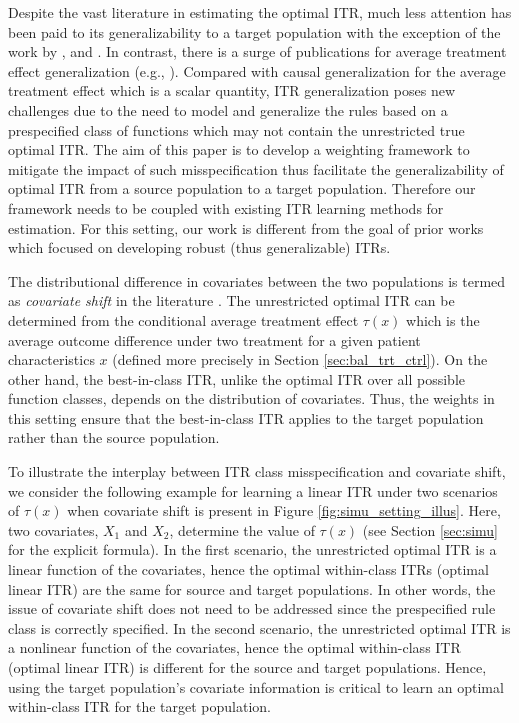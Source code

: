 \documentclass[12pt]{article}
\begin{document}
Despite the vast literature in estimating the optimal ITR, much less attention has been paid to its generalizability to a target population with the exception of the work by \citet{zhao2019robustifying}, and \citet{mo2020learning}. In contrast, there is a surge of publications for average treatment effect generalization (e.g., \cite{Cole2010,tipton2013improving, buchanan2018generalizing,dahabreh2020extending}). Compared with causal generalization for the average treatment effect which is a scalar quantity, ITR generalization poses new challenges due to the need to model and generalize the rules based on a prespecified class of functions which may not contain the unrestricted true optimal ITR. The aim of this paper is to develop a weighting framework to mitigate the impact of such misspecification thus facilitate the generalizability of optimal ITR from a source population to a target population. Therefore our framework needs to be coupled with existing ITR learning methods for estimation. For this setting, our work is different from the goal of prior works \citep{zhao2019robustifying,mo2020learning} which focused on developing robust (thus generalizable) ITRs. 

The distributional difference in covariates between the two populations is termed as \textit{covariate shift} in the literature \citep{sugiyama2007covariate}. The unrestricted optimal ITR can be determined from the conditional average treatment effect $\tau(x)$ which is the average outcome difference under two treatment for a given patient characteristics $x$ (defined more precisely in Section \ref{sec:bal_trt_ctrl}). On the other hand, the best-in-class ITR, unlike the optimal ITR over all possible function classes, depends on the distribution of covariates. Thus, the weights in this setting ensure that the best-in-class ITR applies to the target population rather than the source population.
	
	
To illustrate the interplay between ITR class misspecification and covariate shift, we consider  the following example for  learning a linear ITR under two scenarios of $\tau(x)$ when covariate shift is present in Figure \ref{fig:simu_setting_illus}. Here, two covariates, $X_1$ and $X_2$, determine the value of $\tau(x)$ (see Section \ref{sec:simu} for the explicit formula). In the first scenario, the unrestricted optimal ITR is a linear function of the covariates, hence the optimal within-class ITRs (optimal linear ITR) are the same for source and target populations. In other words, the issue of covariate shift does not need to be addressed since the prespecified rule class is correctly specified. In the second scenario, the unrestricted optimal ITR is a nonlinear function of the covariates, hence the optimal within-class ITR (optimal linear ITR) is different for the source and target populations. Hence, using the target population's covariate information is critical to learn an optimal within-class ITR for the target population.
\end{document}
